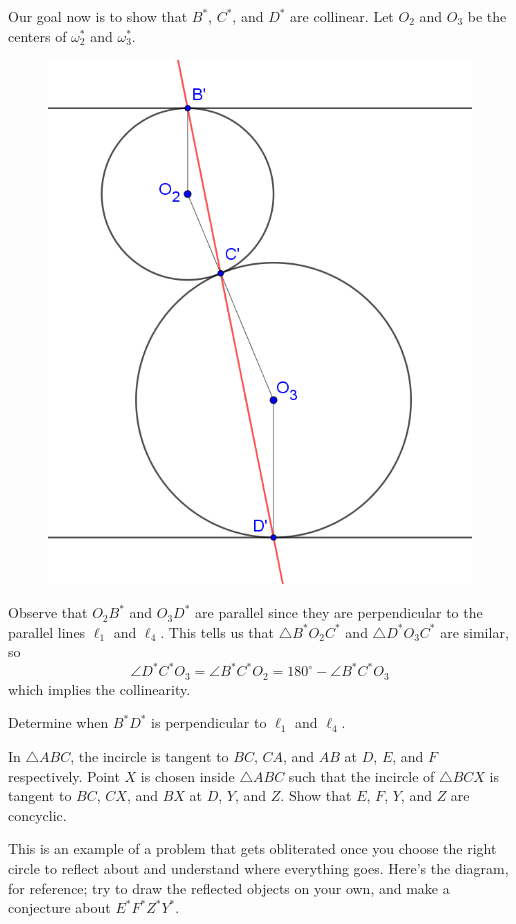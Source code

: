 \documentclass{scrartcl}
\providecommand{\dg}{^\circ}
\begin{document}
Our goal now is to show that $B^\ast$, $C^\ast$, and $D^\ast$ are collinear.
Let $O_2$ and $O_3$ be the centers of $\omega_2^\ast$ and $\omega_3^\ast$.

\begin{figure}[h]
	\centering
	\includegraphics[width=0.4\linewidth]{inversion_egmo824img_focused}
	\label{fig:inversionegmo824imgfocused}
\end{figure}

Observe that $O_2B^\ast$ and $O_3D^\ast$ are parallel
since they are perpendicular to the parallel lines $\ell_1$ and $\ell_4$.
This tells us that
$\triangle B^\ast O_2C^\ast$ and $\triangle D^\ast O_3C^\ast$
are similar, so
\[\angle D^\ast C^\ast O_3 = \angle B^\ast C^\ast O_2 =
180\dg - \angle B^\ast C^\ast O_3\]
which implies the collinearity.

\begin{exercise}
	Determine when $B^\ast D^\ast$ is perpendicular to
	$\ell_1$ and $\ell_4$.
\end{exercise}

\pagebreak

\begin{problem}[Shortlist 1995 G3]
	In $\triangle ABC$, the incircle is tangent to $BC$, $CA$, and $AB$
	at $D$, $E$, and $F$ respectively.
	Point $X$ is chosen inside $\triangle ABC$ such that
	the incircle of $\triangle BCX$ is tangent to $BC$, $CX$, and $BX$
	at $D$, $Y$, and $Z$. Show that $E$, $F$, $Y$, and $Z$ are concyclic.
\end{problem}

This is an example of a problem that gets obliterated
once you choose the right circle to reflect about
and understand where everything goes.
Here's the diagram, for reference; try to draw the reflected objects
on your own, and make a conjecture about $E^\ast F^\ast Z^\ast Y^\ast$.
\end{document}

